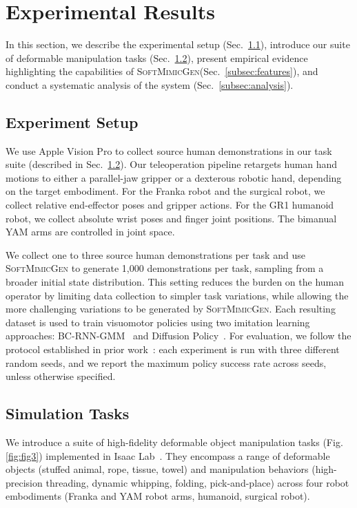 \documentclass[letterpaper, 10 pt, conference]{ieeeconf}  %
\newcommand{\sysName}{\textsc{SoftMimicGen}\xspace}
\begin{document}
\section{Experimental Results}


In this section, we describe the experimental setup (Sec.~\ref{subsec:setup}), introduce our suite of deformable manipulation tasks (Sec.~\ref{subsec:tasks}), present empirical evidence highlighting the capabilities of \sysName (Sec.~\ref{subsec:features}), and conduct a systematic analysis of the system (Sec.~\ref{subsec:analysis}).


\subsection{Experiment Setup}
\label{subsec:setup}


We use Apple Vision Pro to collect source human demonstrations in our task suite (described in Sec.~\ref{subsec:tasks}). Our teleoperation pipeline retargets human hand motions to either a parallel-jaw gripper or a dexterous robotic hand, depending on the target embodiment. For the Franka robot and the surgical robot, we collect relative end-effector poses and gripper actions. For the GR1 humanoid robot, we collect absolute wrist poses and finger joint positions. The bimanual YAM arms are controlled in joint space.


We collect one to three source human demonstrations per task and use \sysName to generate 1,000 demonstrations per task, sampling from a broader initial state distribution. This setting reduces the burden on the human operator by limiting data collection to simpler task variations, while allowing the more challenging variations to be generated by \sysName. Each resulting dataset is used to train visuomotor policies using two imitation learning approaches: BC-RNN-GMM~\cite{mandlekar2021matters} and Diffusion Policy~\cite{chi2023diffusion}. For evaluation, we follow the protocol established in prior work~\cite{mandlekar2021matters}: each experiment is run with three different random seeds, and we report the maximum policy success rate across seeds, unless otherwise specified.


\subsection{Simulation Tasks}
\label{subsec:tasks}


We introduce a suite of high-fidelity deformable object manipulation tasks (Fig. \ref{fig:fig3}) implemented in Isaac Lab~\cite{mittal2025isaac}. They encompass a range of deformable objects (stuffed animal, rope, tissue, towel) and manipulation behaviors (high-precision threading, dynamic whipping, folding, pick-and-place) across four robot embodiments (Franka and YAM robot arms, humanoid, surgical robot).
\end{document}
